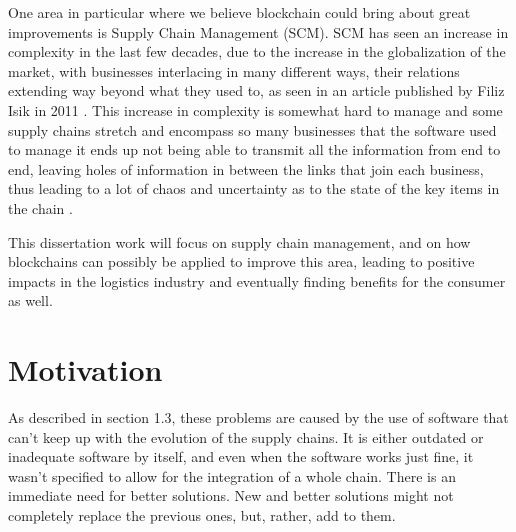 One area in particular where we believe blockchain could bring about great improvements is Supply Chain Management (SCM). SCM has seen an increase in complexity in the last few decades, due to the increase in the globalization of the market, with businesses interlacing in many different ways, their relations extending way beyond what they used to, as seen in an article published by Filiz Isik in 2011 \cite{Isik2011} . This increase in complexity is somewhat hard to manage and some supply chains stretch and encompass so many businesses that the software used to manage it ends up not being able to transmit all the information from end to end, leaving holes of information in between the links that join each business, thus leading to a lot of chaos and uncertainty as to the state of the key items in the chain \cite{Wilding1998}. 

   This dissertation work will focus on supply chain management, and on how blockchains can possibly be applied to improve this area, leading to positive impacts in the logistics industry and eventually finding benefits for the consumer as well. 




\section{Motivation} \label{sec:motivation}

As described in section 1.3, these problems are caused by the use of software that can't keep up with the evolution of the supply chains. It is either outdated or inadequate software by itself, and even when the software works just fine, it wasn't specified to allow for the integration of a whole chain. There is an immediate need for better solutions. New and better solutions might not completely replace the previous ones, but, rather, add to them.
    
